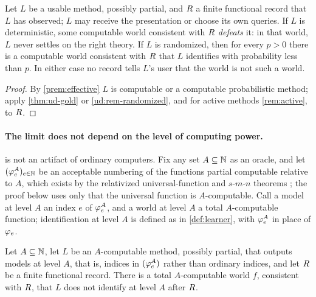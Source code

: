 \begin{corollary}\label{ud:cor-every-method-fails}
Let $L$ be a usable method, possibly partial, and $R$ a finite functional record that
$L$ has observed; $L$ may receive the presentation or choose its own queries. If $L$
is deterministic, some computable world consistent with $R$ \emph{defeats} it: in
that world, $L$ never settles on the right theory. If $L$ is randomized, then for every
$p>0$ there is a computable world consistent with $R$ that $L$ identifies with
probability less than $p$. In either case no
record tells $L$'s user that the world is not such a world.
\end{corollary}

\begin{proof}
By \cref{prem:effective} $L$ is computable or a computable probabilistic method;
apply \cref{thm:ud-gold} or \cref{ud:rem-randomized}, and for active methods
\cref{rem:active}, to $R$.
\end{proof}

\paragraph{The limit does not depend on the level of computing power.}
 is not an artifact of ordinary computers. Fix any set $A\subseteq\mathbb{N}$
as an oracle, and let $(\varphi_{e}^A)_{e\in\mathbb{N}}$ be an acceptable numbering of the functions
partial computable relative to $A$, which exists by the relativized universal-function
and $s$-$m$-$n$ theorems \citep[ch.~9]{rogers1967}; the proof below uses only that the universal
function is $A$-computable. Call a model at level $A$ an index $e$ of
$\varphi_{e}^A$, and a world at level $A$ a total $A$-computable function; identification
at level $A$ is defined as in \cref{def:learner}, with $\varphi_{e}^A$ in place of
$\varphi_{e}$.

\begin{theorem}\label{thm:ud-gold-rel}
Let $A\subseteq\mathbb{N}$, let $L$ be an $A$-computable method, possibly partial, that outputs
models at level $A$, that is, indices in $(\varphi_{e}^A)$ rather than ordinary indices, and
let $R$ be a finite functional record. There is a total $A$-computable world $f$,
consistent with $R$, that $L$ does not identify at level $A$ after $R$.
\end{theorem}

